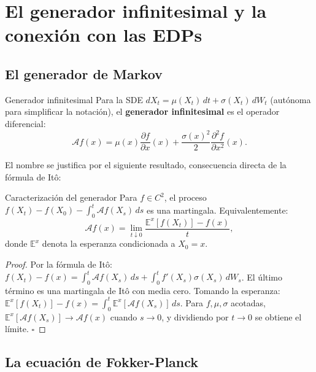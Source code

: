 \section{El generador infinitesimal y la conexión con las EDPs}
\label{sec:generador}

\subsection{El generador de Markov}
\label{subsec:generador}

\begin{definicion}{Generador infinitesimal}
\label{def:generador}
Para la SDE $dX_t = \mu(X_t)\,dt + \sigma(X_t)\,dW_t$ (autónoma para
simplificar la notación), el \textbf{generador infinitesimal} es el operador
diferencial:
\begin{equation}
  \mathcal{A}f(x)
  = \mu(x)\frac{\partial f}{\partial x}(x)
  + \frac{\sigma(x)^2}{2}\frac{\partial^2 f}{\partial x^2}(x).
  \label{eq:generador}
\end{equation}
\end{definicion}

El nombre se justifica por el siguiente resultado, consecuencia directa de la
fórmula de Itô:

\begin{proposicion}{Caracterización del generador}
\label{prop:generador_def}
Para $f \in C^2$, el proceso $f(X_t) - f(X_0) - \int_0^t \mathcal{A}f(X_s)\,ds$
es una martingala. Equivalentemente:
\[
  \mathcal{A}f(x) = \lim_{t\downarrow 0}
  \frac{\mathbb{E}^x[f(X_t)] - f(x)}{t},
\]
donde $\mathbb{E}^x$ denota la esperanza condicionada a $X_0 = x$.
\end{proposicion}

\begin{proof}
Por la fórmula de Itô: $f(X_t) - f(x) = \int_0^t \mathcal{A}f(X_s)\,ds
+ \int_0^t f'(X_s)\sigma(X_s)\,dW_s$. El último término es una martingala
de Itô con media cero. Tomando la esperanza:
$\mathbb{E}^x[f(X_t)] - f(x) = \int_0^t \mathbb{E}^x[\mathcal{A}f(X_s)]\,ds$.
Para $f, \mu, \sigma$ acotadas, $\mathbb{E}^x[\mathcal{A}f(X_s)] \to \mathcal{A}f(x)$
cuando $s \to 0$, y dividiendo por $t \to 0$ se obtiene el límite. $\square$
\end{proof}

\subsection{La ecuación de Fokker-Planck}
\label{subsec:fokker_planck}

